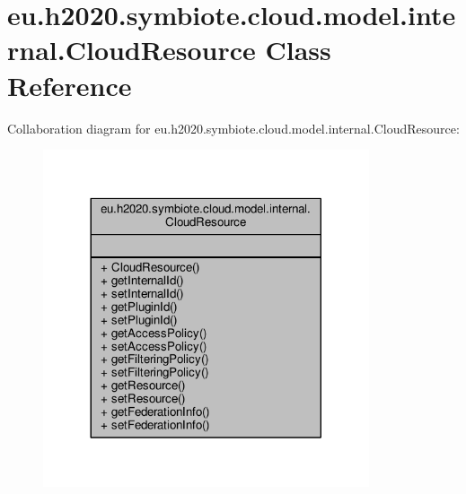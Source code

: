\hypertarget{classeu_1_1h2020_1_1symbiote_1_1cloud_1_1model_1_1internal_1_1CloudResource}{}\section{eu.\+h2020.\+symbiote.\+cloud.\+model.\+internal.\+Cloud\+Resource Class Reference}
\label{classeu_1_1h2020_1_1symbiote_1_1cloud_1_1model_1_1internal_1_1CloudResource}


Collaboration diagram for eu.\+h2020.\+symbiote.\+cloud.\+model.\+internal.\+Cloud\+Resource\+:\nopagebreak
\begin{figure}[H]
\begin{center}
\leavevmode
\includegraphics[width=272pt]{classeu_1_1h2020_1_1symbiote_1_1cloud_1_1model_1_1internal_1_1CloudResource__coll__graph}
\end{center}
\end{figure}
